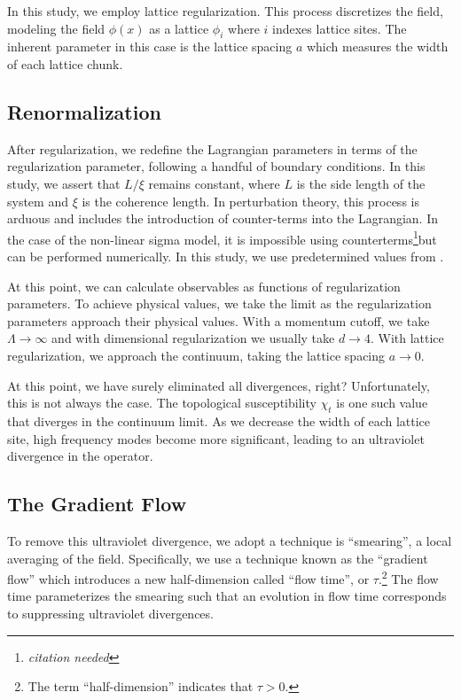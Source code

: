 \documentclass[12pt]{report}
\newcommand{\citeneeded}{\footnote{\textit{citation needed}}}
\begin{document}
In this study, we employ lattice regularization. This process discretizes the field, modeling the field $\phi(x)$ as a lattice $\phi_i$ where $i$ indexes lattice sites. The inherent parameter in this case is the lattice spacing $a$ which measures the width of each lattice chunk.

\subsection{Renormalization}
After regularization, we redefine the Lagrangian parameters in terms of the regularization parameter, following a handful of boundary conditions. In this study, we assert that $L/\xi$ remains constant, where $L$ is the side length of the system and $\xi$ is the coherence length. In perturbation theory, this process is arduous and includes the introduction of counter-terms into the Lagrangian. In the case of the non-linear sigma model, it is impossible using counterterms\citeneeded but can be performed numerically. In this study, we use predetermined values from \cite{bietenholz2018}.

At this point, we can calculate observables as functions of regularization parameters. To achieve physical values, we take the limit as the regularization parameters approach their physical values. With a momentum cutoff, we take $\Lambda \rightarrow \infty$ and with dimensional regularization we usually take $d\rightarrow 4$. With lattice regularization, we approach the continuum, taking the lattice spacing $a\rightarrow 0$. 

At this point, we have surely eliminated all divergences, right? Unfortunately, this is not always the case. The topological susceptibility $\chi_t$ is one such value that diverges in the continuum limit. As we decrease the width of each lattice site, high frequency modes become more significant, leading to an ultraviolet divergence in the operator. 

\subsection{The Gradient Flow}
\label{sec:gradflow}
To remove this ultraviolet divergence, we adopt a technique is ``smearing'', a local averaging of the field.\cite{solbrig2007} Specifically, we use a technique known as the ``gradient flow'' \cite{monahan2015} which introduces a new half-dimension called ``flow time'', or $\tau$.\footnote{The term ``half-dimension'' indicates that $\tau>0$.}  The flow time parameterizes the smearing such that an evolution in flow time corresponds to suppressing ultraviolet divergences. 
\end{document}
